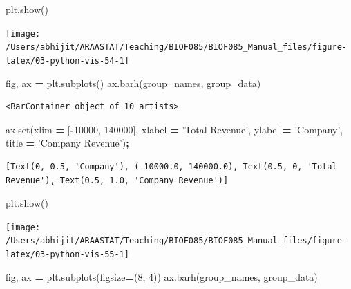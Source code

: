 \documentclass[
  letterpaper,
]{scrbook}
\newenvironment{Shaded}{\begin{snugshade}}{\end{snugshade}}
\newcommand{\BuiltInTok}[1]{#1}
\newcommand{\DecValTok}[1]{\textcolor[rgb]{0.00,0.00,0.81}{#1}}
\newcommand{\NormalTok}[1]{#1}
\newcommand{\OperatorTok}[1]{\textcolor[rgb]{0.81,0.36,0.00}{\textbf{#1}}}
\newcommand{\StringTok}[1]{\textcolor[rgb]{0.31,0.60,0.02}{#1}}
\begin{document}
\begin{Shaded}
\begin{Highlighting}[]
\NormalTok{plt.show()}
\end{Highlighting}
\end{Shaded}

\begin{center}\texttt{[image: /Users/abhijit/ARAASTAT/Teaching/BIOF085/BIOF085\_Manual\_files/figure-latex/03-python-vis-54-1]} \end{center}

\begin{Shaded}
\begin{Highlighting}[]
\NormalTok{fig, ax }\OperatorTok{=}\NormalTok{ plt.subplots()}
\NormalTok{ax.barh(group_names, group_data)}
\end{Highlighting}
\end{Shaded}

\begin{verbatim}
<BarContainer object of 10 artists>
\end{verbatim}

\begin{Shaded}
\begin{Highlighting}[]
\NormalTok{ax.}\BuiltInTok{set}\NormalTok{(xlim }\OperatorTok{=}\NormalTok{ [}\OperatorTok{-}\DecValTok{10000}\NormalTok{, }\DecValTok{140000}\NormalTok{], xlabel }\OperatorTok{=} \StringTok{'Total Revenue'}\NormalTok{, ylabel }\OperatorTok{=} \StringTok{'Company'}\NormalTok{, }
\NormalTok{       title }\OperatorTok{=} \StringTok{'Company Revenue'}\NormalTok{)}\OperatorTok{;}
\end{Highlighting}
\end{Shaded}

\begin{verbatim}
[Text(0, 0.5, 'Company'), (-10000.0, 140000.0), Text(0.5, 0, 'Total Revenue'), Text(0.5, 1.0, 'Company Revenue')]
\end{verbatim}

\begin{Shaded}
\begin{Highlighting}[]
\NormalTok{plt.show()}
\end{Highlighting}
\end{Shaded}

\begin{center}\texttt{[image: /Users/abhijit/ARAASTAT/Teaching/BIOF085/BIOF085\_Manual\_files/figure-latex/03-python-vis-55-1]} \end{center}

\begin{Shaded}
\begin{Highlighting}[]
\NormalTok{fig, ax }\OperatorTok{=}\NormalTok{ plt.subplots(figsize}\OperatorTok{=}\NormalTok{(}\DecValTok{8}\NormalTok{, }\DecValTok{4}\NormalTok{))}
\NormalTok{ax.barh(group_names, group_data)}
\end{Highlighting}
\end{Shaded}
\end{document}
